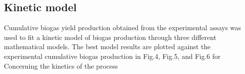 \subsection{Kinetic model}
Cumulative biogas yield production obtained from the experimental assays was used to fit a kinetic model of biogas production through three different mathematical models. The best model results are plotted against the experimental cumulative biogas production in Fig.4, Fig.5, and Fig.6 for 
Concerning the kinetics of the process